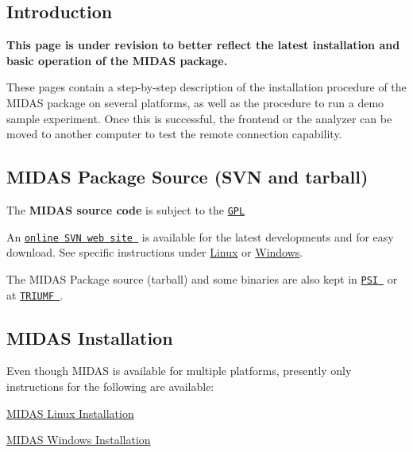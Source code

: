\par
 

\par
\hypertarget{Quickstart_Q_QuickStartIntro}{}\subsection{Introduction}\label{Quickstart_Q_QuickStartIntro}
{\bfseries  This page is under revision to better reflect the latest installation and basic operation of the {\bfseries MIDAS package}. }

These pages contain a step-\/by-\/step description of the installation procedure of the MIDAS package on several platforms, as well as the procedure to run a demo sample experiment. Once this is successful, the frontend or the analyzer can be moved to another computer to test the remote connection capability.\hypertarget{Quickstart_Q_SVN}{}\subsection{MIDAS Package Source (SVN and tarball)}\label{Quickstart_Q_SVN}
The {\bfseries MIDAS source code} is subject to the \href{http://www.gnu.org/copyleft/gpl.html}{\tt GPL}

An \href{http://savannah.psi.ch/viewcvs/trunk/?root=midas}{\tt online SVN web site } is available for the latest developments and for easy download. See specific instructions under \hyperlink{Q_Linux_Q_Linux_Midas_Installation}{Linux} or \hyperlink{Q_Windows_Q_Windows_installation}{Windows}.

The MIDAS Package source (tarball) and some binaries are also kept in \href{http://midas.psi.ch/download}{\tt PSI } or at \href{http://ladd00.triumf.ca/~daqweb/ftp/}{\tt TRIUMF }.\hypertarget{Quickstart_Q_Quickstart_Installation}{}\subsection{MIDAS Installation}\label{Quickstart_Q_Quickstart_Installation}
Even though MIDAS is available for multiple platforms, presently only instructions for the following are available:  
\begin{DoxyEnumerate}
\item \hyperlink{Q_Linux}{MIDAS Linux Installation} 
\item \hyperlink{Q_Windows}{MIDAS Windows Installation} 
\end{DoxyEnumerate}

\par
 

